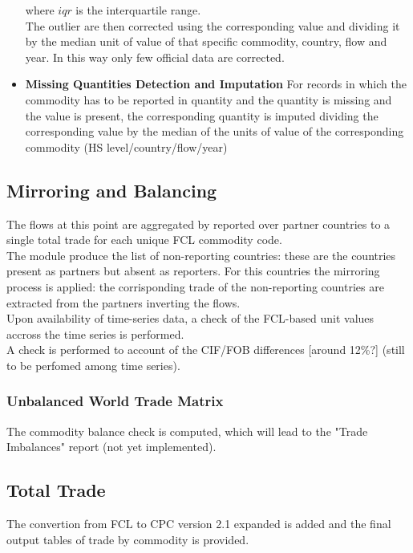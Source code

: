 \documentclass[nojss]{jss}\usepackage[]{graphicx}\usepackage[]{color}
\begin{document}
\begin{itemize}
\begin{itemize}
\begin{equation}
\end{equation}
\end{itemize}
where $iqr$ is the interquartile range.\\
The outlier are then corrected using the corresponding value and dividing it by the median unit of value of that specific commodity, country, flow and year. In this way only few official data are corrected.
\item {\bf Missing Quantities Detection and Imputation} For records in which the commodity has to be reported in quantity and the quantity is missing and the value is present, the corresponding quantity is imputed dividing the corresponding value by the median of the units of value of the corresponding commodity (HS level/country/flow/year)
\end{itemize}

\subsection{Mirroring and Balancing}
The flows at this point are aggregated by reported over partner countries to a single total trade for each unique FCL commodity code.\\
The module produce the list of non-reporting countries: these are the countries present as partners but absent as reporters. For this countries the mirroring process is applied: the corrisponding trade of the non-reporting countries are extracted from the partners inverting the flows.\\
Upon availability of time-series data, a check of the FCL-based unit values accross the time series is performed.\\
A check is performed to account of the CIF/FOB differences [around 12\%?] (still to be perfomed among time series).

\subsubsection{Unbalanced World Trade Matrix}
The commodity balance check is computed, which will lead to the "Trade Imbalances" report (not yet implemented).

\subsection{Total Trade}
The convertion from FCL to CPC version 2.1 expanded is added and the final output tables of trade by commodity is provided.
\end{document}
